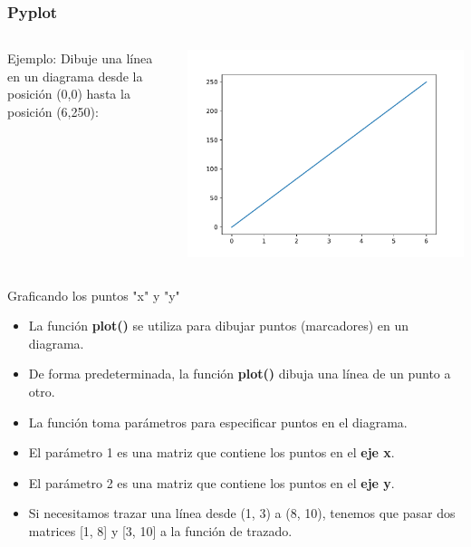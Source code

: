 \begin{frame}[fragile]
  \frametitle{Pyplot}

  \begin{columns}
        \begin{exampleblock}{Ejemplo:}
          Dibuje una línea en un diagrama desde la posición
          (0,0) hasta la posición (6,250):
          
        \end{exampleblock}
      \pausa
      \begin{center}
          \includegraphics[scale=0.5]{ejemplos/e01.pdf}
      \end{center}
  \end{columns}
\end{frame}

\begin{frame}[c]{Graficando los puntos "x" y "y"}
  \begin{itemize}
    \item La función \textbf{plot()} se utiliza para dibujar puntos
      (marcadores) en un diagrama.
    \item De forma predeterminada, la función \textbf{plot()} dibuja
      una línea de un punto a otro.
    \item La función toma parámetros para especificar puntos en el diagrama.
    \item El parámetro 1 es una matriz que contiene los puntos en el
      \textbf{eje x}.
    \item El parámetro 2 es una matriz que contiene los puntos en el
      \textbf{eje y}.
    \item Si necesitamos trazar una línea desde (1, 3) a (8, 10),
      tenemos que pasar dos matrices [1, 8] y [3, 10] a la función de trazado.
  \end{itemize}
\end{frame}

